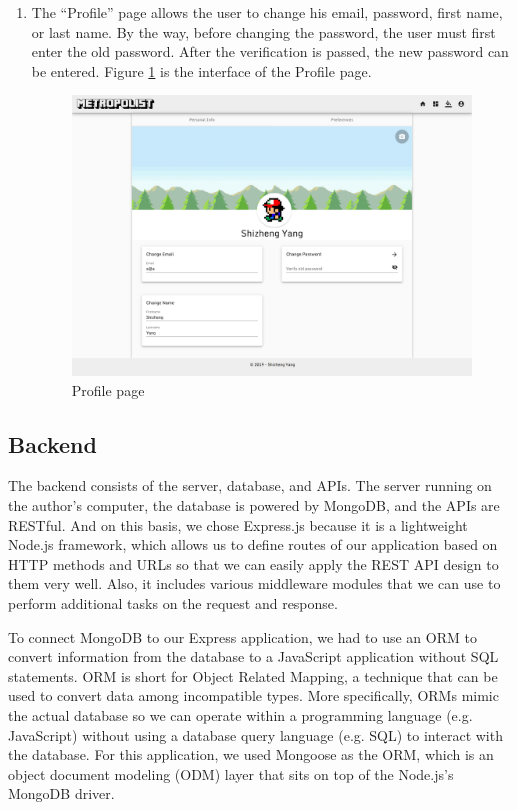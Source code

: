 \begin{enumerate}
  \item The ``Profile'' page allows the user to change his email, password, first name, or last name. By the way, before changing the password, the user must first enter the old password. After the verification is passed, the new password can be entered. Figure \ref{fig:GUI profile} is the interface of the Profile page.

  \begin{figure}[htbp]
    \includegraphics[width=\textwidth]{section04/assets/GUI-profile.png}
    \caption{Profile page}
    \label{fig:GUI profile}
  \end{figure}

\end{enumerate}

\subsection{Backend}
The backend consists of the server, database, and APIs. The server running on the author's computer, the database is powered by MongoDB, and the APIs are RESTful. And on this basis, we chose Express.js because it is a lightweight Node.js framework, which allows us to define routes of our application based on HTTP methods and URLs so that we can easily apply the REST API design to them very well. Also, it includes various middleware modules that we can use to perform additional tasks on the request and response.

To connect MongoDB to our Express application, we had to use an ORM to convert information from the database to a JavaScript application without SQL statements. ORM is short for Object Related Mapping, a technique that can be used to convert data among incompatible types. More specifically, ORMs mimic the actual database so we can operate within a programming language (e.g. JavaScript) without using a database query language (e.g. SQL) to interact with the database. For this application, we used Mongoose as the ORM, which is an object document modeling (ODM) layer that sits on top of the Node.js's MongoDB driver.

